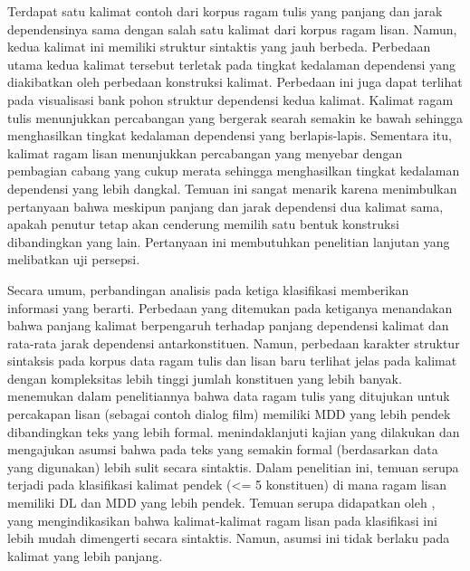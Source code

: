 Terdapat satu kalimat contoh dari korpus ragam tulis yang panjang dan jarak dependensinya sama dengan salah satu kalimat dari korpus ragam lisan. Namun, kedua kalimat ini memiliki struktur sintaktis yang jauh berbeda. Perbedaan utama kedua kalimat tersebut terletak pada tingkat kedalaman dependensi yang diakibatkan oleh perbedaan konstruksi kalimat. Perbedaan ini juga dapat terlihat pada visualisasi bank pohon struktur dependensi kedua kalimat. Kalimat ragam tulis menunjukkan percabangan yang bergerak searah semakin ke bawah sehingga menghasilkan tingkat kedalaman dependensi yang berlapis-lapis. Sementara itu, kalimat ragam lisan menunjukkan percabangan yang menyebar dengan pembagian cabang yang cukup merata sehingga menghasilkan tingkat kedalaman dependensi yang lebih dangkal. Temuan ini sangat menarik karena menimbulkan pertanyaan bahwa meskipun panjang dan jarak dependensi dua kalimat sama, apakah penutur tetap akan cenderung memilih satu bentuk konstruksi dibandingkan yang lain. Pertanyaan ini membutuhkan penelitian lanjutan yang melibatkan uji persepsi.

Secara umum, perbandingan analisis pada ketiga klasifikasi memberikan informasi yang berarti. Perbedaan yang ditemukan pada ketiganya menandakan bahwa panjang kalimat berpengaruh terhadap panjang dependensi kalimat dan rata-rata jarak dependensi antarkonstituen. Namun, perbedaan karakter struktur sintaksis pada korpus data ragam tulis dan lisan baru terlihat jelas pada kalimat dengan kompleksitas lebih tinggi jumlah konstituen yang lebih banyak. \cite{wang2017effects} menemukan dalam penelitiannya bahwa data ragam tulis yang ditujukan untuk percakapan lisan (sebagai contoh dialog film) memiliki MDD yang lebih pendek dibandingkan teks yang lebih formal. \cite{wang2017effects} menindaklanjuti kajian yang dilakukan \cite{hiranuma1999syntactic} dan \cite{liu2009chinese} mengajukan asumsi bahwa pada teks yang semakin formal (berdasarkan data yang digunakan) lebih sulit secara sintaktis. Dalam penelitian ini, temuan serupa terjadi pada klasifikasi kalimat pendek (\textless= 5 konstituen) di mana ragam lisan memiliki DL dan MDD yang lebih pendek. Temuan serupa didapatkan oleh \cite{wang2017effects}, yang mengindikasikan bahwa kalimat-kalimat ragam lisan pada klasifikasi ini lebih mudah dimengerti secara sintaktis. Namun, asumsi ini tidak berlaku pada kalimat yang lebih panjang. 

